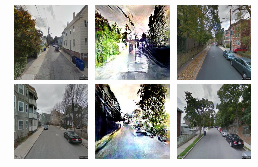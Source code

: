 \begin{table}
\begin{tabular}{l*3{C}@{}}
		& \includegraphics[width=11em]{Plot/examples/u_4} & \includegraphics[width=11em]{Plot/examples/t_4} &  \includegraphics[width=11em]{Plot/examples/b_4} \\ 
		& \includegraphics[width=11em]{Plot/examples/u_5} & \includegraphics[width=11em]{Plot/examples/t_5} &  \includegraphics[width=11em]{Plot/examples/b_5} \\ 

\end{tabular}
\end{table}
